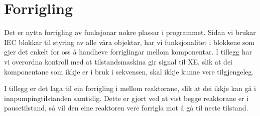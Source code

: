 \section{Forrigling}
\thispagestyle{fancy}


Det er nytta \gls{forrigling} av funksjonar nokre plassar i programmet. 
Sidan vi brukar IEC blokkar til styring av alle våra objektar, har vi funksjonalitet i blokkene som gjer det enkelt for oss å 
handheve forriglingar mellom komponentar.
I tillegg har vi overordna kontroll med at tilstandsmaskina gir signal til XE, slik at dei komponentane som ikkje er i bruk i 
sekvensen, skal ikkje kunne vere tilgjengeleg.

I tillegg er det laga til ein forrigling i mellom reaktorane, slik at dei ikkje kan gå i innpumpingtilstanden samtidig. 
Dette er gjort ved at vist begge reaktorane er i pausetilstand, så vil den eine reaktoren vere forrigla mot å gå til neste tilstand.










